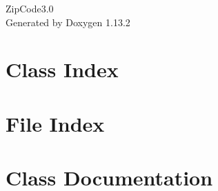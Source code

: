 \documentclass[twoside]{book}
\newcommand{\+}{\discretionary{\mbox{\scriptsize$\hookleftarrow$}}{}{}}
\newcommand{\clearemptydoublepage}{%
    \newpage{\pagestyle{empty}\cleardoublepage}%
  }
\begin{document}
  \raggedbottom
    \hypersetup{pageanchor=false,
                bookmarksnumbered=true,
                pdfencoding=unicode
               }
  \begin{titlepage}
  \vspace*{7cm}
  \begin{center}%
  {\Large Zip\+Code3.\+0}\\
  \vspace*{1cm}
  {\large Generated by Doxygen 1.13.2}\\
  \end{center}
  \end{titlepage}
  \clearemptydoublepage
  \tableofcontents
  \clearemptydoublepage
  \hypersetup{pageanchor=true}

\chapter{Class Index}

\chapter{File Index}

\chapter{Class Documentation}









\end{document}
